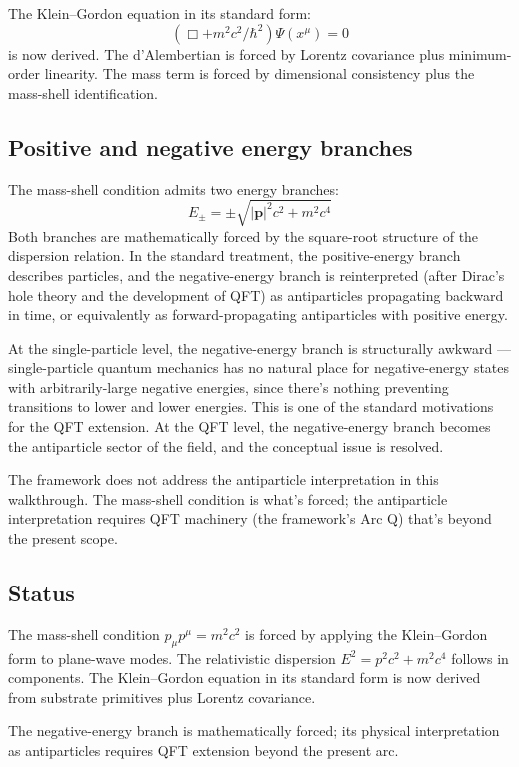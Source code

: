 \documentclass[11pt,a4paper]{article}
\begin{document}
The Klein--Gordon equation in its standard form:
\[
(\Box + m^{2}c^{2}/\hbar^{2})\Psi(x^\mu) = 0
\]
is now derived. The d'Alembertian is forced by Lorentz covariance plus minimum-order linearity. The mass term is forced by dimensional consistency plus the mass-shell identification.

\subsection{Positive and negative energy branches}

The mass-shell condition admits two energy branches:
\[
E_\pm = \pm\sqrt{|\mathbf{p}|^{2}c^{2} + m^{2}c^{4}}
\]
Both branches are mathematically forced by the square-root structure of the dispersion relation. In the standard treatment, the positive-energy branch describes particles, and the negative-energy branch is reinterpreted (after Dirac's hole theory and the development of QFT) as antiparticles propagating backward in time, or equivalently as forward-propagating antiparticles with positive energy.

At the single-particle level, the negative-energy branch is structurally awkward --- single-particle quantum mechanics has no natural place for negative-energy states with arbitrarily-large negative energies, since there's nothing preventing transitions to lower and lower energies. This is one of the standard motivations for the QFT extension. At the QFT level, the negative-energy branch becomes the antiparticle sector of the field, and the conceptual issue is resolved.

The framework does not address the antiparticle interpretation in this walkthrough. The mass-shell condition is what's forced; the antiparticle interpretation requires QFT machinery (the framework's Arc Q) that's beyond the present scope.

\subsection{Status}

The mass-shell condition $p_\mu p^\mu = m^2c^2$ is forced by applying the Klein--Gordon form to plane-wave modes. The relativistic dispersion $E^2 = p^2c^2 + m^2c^4$ follows in components. The Klein--Gordon equation in its standard form is now derived from substrate primitives plus Lorentz covariance.

The negative-energy branch is mathematically forced; its physical interpretation as antiparticles requires QFT extension beyond the present arc.
\end{document}
